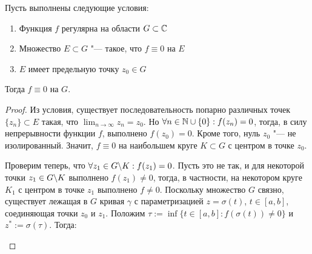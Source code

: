 \begin{theorem}
	Пусть выполнены следующие условия:
	\begin{enumerate}
		\item Функция $f$ регулярна на области $G \subset \mathbb{C}$
		\item Множество $E \subset G$ "--- такое, что $f \equiv 0$ на $E$
		\item $E$ имеет предельную точку $z_0 \in G$
	\end{enumerate}
	
	Тогда $f \equiv 0$ на $G$.
\end{theorem}

\begin{proof}
	Из условия, существует последовательность попарно различных точек $\{z_n\} \subset E$ такая, что $\lim_{n \to \infty}z_n = z_0$. Но $\forall n \in \mathbb{N} \cup \{0\}: f(z_n) = 0$, тогда, в силу непрерывности функции $f$, выполнено $f(z_0) = 0$. Кроме того, нуль $z_0$ "--- не изолированный. Значит, $f \equiv 0$ на наибольшем круге $K \subset G$ с центром в точке $z_0$.
	
	Проверим теперь, что $\forall z_1 \in G \backslash K : f(z_1) = 0$. Пусть это не так, и для некоторой точки $z_1 \in G \backslash K$ выполнено $f(z_1) \ne 0$, тогда, в частности, на некотором круге $K_1$ с центром в точке $z_1$ выполнено $f \ne 0$. Поскольку множество $G$ связно, существует лежащая в $G$ кривая $\gamma$ с параметризацией $z = \sigma(t)$, $t \in [a, b]$, соединяющая точки $z_0$ и $z_1$. Положим $\tau := \inf\{t \in [a, b]: f(\sigma(t)) \ne 0\}$ и $z^* := \sigma(\tau)$. Тогда:
	\begin{center}
\end{center}
\end{proof}
